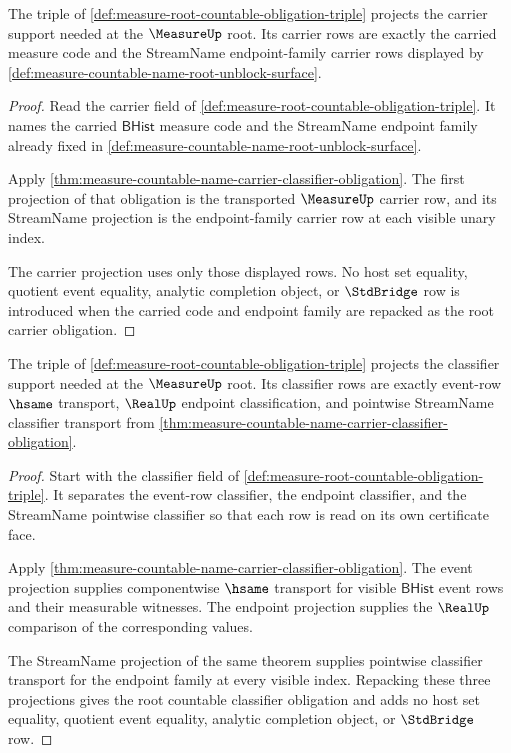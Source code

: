 \begin{theorem}
\label{thm:measure-root-countable-carrier-obligation}
The triple of \autoref{def:measure-root-countable-obligation-triple}
projects the carrier support needed at the $\MeasureUp$ root. Its carrier
rows are exactly the carried measure code and the StreamName endpoint-family
carrier rows displayed by
\autoref{def:measure-countable-name-root-unblock-surface}.
\end{theorem}
\begin{proof}
Read the carrier field of
\autoref{def:measure-root-countable-obligation-triple}. It names the carried
$\mathsf{BHist}$ measure code and the StreamName endpoint family already
fixed in \autoref{def:measure-countable-name-root-unblock-surface}.

Apply \autoref{thm:measure-countable-name-carrier-classifier-obligation}.
The first projection of that obligation is the transported $\MeasureUp$
carrier row, and its StreamName projection is the endpoint-family carrier row
at each visible unary index.

The carrier projection uses only those displayed rows. No host set equality,
quotient event equality, analytic completion object, or $\StdBridge$ row is
introduced when the carried code and endpoint family are repacked as the root
carrier obligation.
\end{proof}

\begin{theorem}
\label{thm:measure-root-countable-classifier-obligation}
The triple of \autoref{def:measure-root-countable-obligation-triple}
projects the classifier support needed at the $\MeasureUp$ root. Its
classifier rows are exactly event-row $\hsame$ transport, $\RealUp$ endpoint
classification, and pointwise StreamName classifier transport from
\autoref{thm:measure-countable-name-carrier-classifier-obligation}.
\end{theorem}
\begin{proof}
Start with the classifier field of
\autoref{def:measure-root-countable-obligation-triple}. It separates the
event-row classifier, the endpoint classifier, and the StreamName pointwise
classifier so that each row is read on its own certificate face.

Apply \autoref{thm:measure-countable-name-carrier-classifier-obligation}.
The event projection supplies componentwise $\hsame$ transport for visible
$\mathsf{BHist}$ event rows and their measurable witnesses. The endpoint
projection supplies the $\RealUp$ comparison of the corresponding values.

The StreamName projection of the same theorem supplies pointwise classifier
transport for the endpoint family at every visible index. Repacking these
three projections gives the root countable classifier obligation and adds no
host set equality, quotient event equality, analytic completion object, or
$\StdBridge$ row.
\end{proof}


